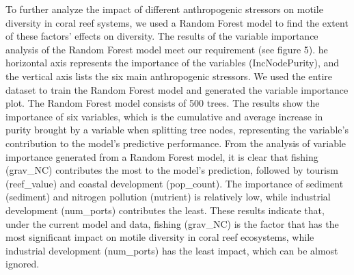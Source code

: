 \documentclass[a4paper, 11]{article}
\begin{document}
To further analyze the impact of different anthropogenic stressors on motile diversity in coral reef systems, we used a Random Forest model to find the extent of these factors' effects on diversity. The results of the variable importance analysis of the Random Forest model meet our requirement (see figure 5). he horizontal axis represents the importance of the variables (IncNodePurity), and the vertical axis lists the six main anthropogenic stressors. We used the entire dataset to train the Random Forest model and generated the variable importance plot. The Random Forest model consists of 500 trees. The results show the importance of six variables, which is the cumulative and average increase in purity brought by a variable when splitting tree nodes, representing the variable's contribution to the model's predictive performance. From the analysis of variable importance generated from a Random Forest model, it is clear that fishing (grav\_NC) contributes the most to the model's prediction, followed by tourism (reef\_value) and coastal development (pop\_count). The importance of sediment (sediment) and nitrogen pollution (nutrient) is relatively low, while industrial development (num\_ports) contributes the least. These results indicate that, under the current model and data, fishing (grav\_NC) is the factor that has the most significant impact on motile diversity in coral reef ecosystems, while industrial development (num\_ports) has the least impact, which can be almost ignored.



\end{document}
